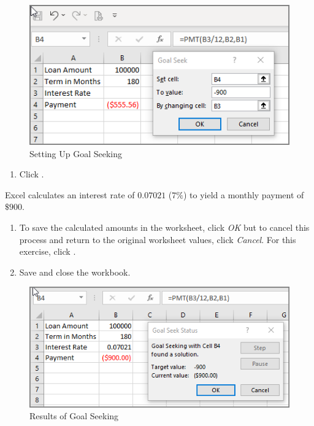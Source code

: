 \begin{figure}[H]
	\centering
	\includegraphics[width=\maxwidth{.95\linewidth}]{gfx/ch08_fig60}
	\caption{Setting Up Goal Seeking}
	\label{08:fig60}
\end{figure}

\begin{enumerate}[resume]	
	\item Click .
\end{enumerate}

Excel calculates an interest rate of $ 0.07021 $ ($ 7\% $) to yield a monthly payment of $ \$900 $. 

\begin{enumerate}[resume]
	\item To save the calculated amounts in the worksheet, click \textit{OK} but to cancel this process and return to the original worksheet values, click \textit{Cancel}. For this exercise, click .
	\item Save and close the  workbook.
\end{enumerate}

\begin{figure}[H]
	\centering
	\includegraphics[width=\maxwidth{.95\linewidth}]{gfx/ch08_fig61}
	\caption{Results of Goal Seeking}
	\label{08:fig61}
\end{figure}

